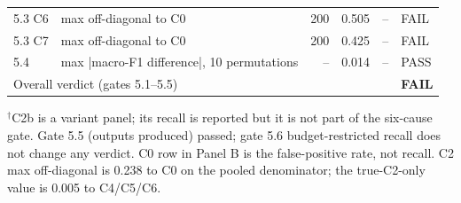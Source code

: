 \begin{table}[t]
\begin{tabular}{llrrrl}
5.3 C6 & max off-diagonal to C0 & 200 & 0.505 & -- & FAIL \\
5.3 C7 & max off-diagonal to C0 & 200 & 0.425 & -- & FAIL \\
5.4 & max |macro-F1 difference|, 10 permutations & -- & 0.014 & -- & PASS \\
\multicolumn{5}{l}{Overall verdict (gates 5.1--5.5)} & \textbf{FAIL} \\
\bottomrule
\end{tabular}
\par\smallskip
\footnotesize
$^\dagger$C2b is a variant panel; its recall is reported but it is not part of the six-cause gate. Gate 5.5 (outputs produced) passed; gate 5.6 budget-restricted recall does not change any verdict. C0 row in Panel B is the false-positive rate, not recall. C2 max off-diagonal is 0.238 to C0 on the pooled denominator; the true-C2-only value is 0.005 to C4/C5/C6.
\end{table}

